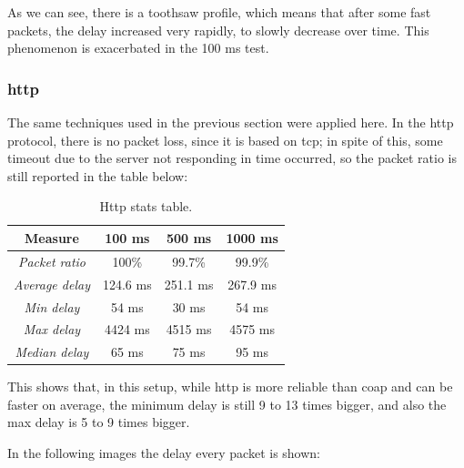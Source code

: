 \documentclass[]{article}
\begin{document}
\begin{figure}[h]
\begin{subfigure}{0.5\textwidth}
		\caption{}
		\label{fig:coap1000ms}
	\end{subfigure}
	
\end{figure}



As we can see, there is a toothsaw profile, which means that after some fast packets, the delay increased very rapidly, to slowly decrease over time. This phenomenon is exacerbated in the 100 ms test. 

\subsubsection{http}

The same techniques used in the previous section were applied here. In the http protocol, there is no packet loss, since it is based on tcp; in spite of this, some timeout due to the server not responding in time occurred, so the packet ratio is still reported in the table below:

\begin{table}
	\centering
	\begin{tabular}{|c|c|c|c|}
		\hline
		\textbf{Measure} & \textbf{100 ms} & \textbf{500 ms} & \textbf{1000 ms} \\
		\hline
		\textit{Packet ratio} & 100\% & 99.7\%  & 99.9\% \\
		\hline
		\textit{Average delay} & 124.6 ms & 251.1 ms & 267.9 ms \\
		\hline
		\textit{Min delay} & 54 ms & 30 ms & 54 ms \\
		\hline
		\textit{Max delay} & 4424 ms & 4515 ms & 4575 ms \\
		\hline
		\textit{Median delay} & 65 ms & 75 ms & 95 ms \\
		\hline
	\end{tabular} 
	\caption{\label{http}Http stats table.}
\end{table}

This shows that, in this setup, while http is more reliable than coap and can be faster on average, the minimum delay is still 9 to 13 times bigger, and also the max delay is 5 to 9 times bigger. 

In the following images the delay every packet is shown:
\end{document}
